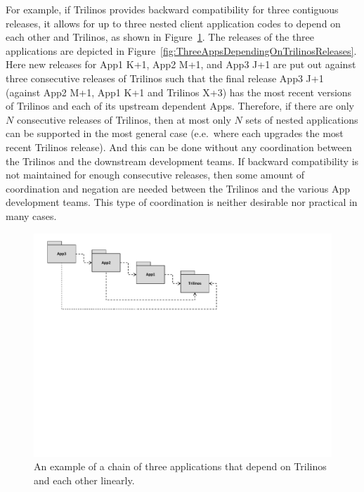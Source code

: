 \documentclass[11pt]{SANDreport}
\begin{document}
For example, if Trilinos provides backward compatibility for three
contiguous releases, it allows for up to three nested client
application codes to depend on each other and Trilinos, as shown in
Figure~\ref{fig:ThreeAppsDependingOnTrilinos}.  The releases of the
three applications are depicted in
Figure~\ref{fig:ThreeAppsDependingOnTrilinosReleases}.  Here new
releases for App1 K+1, App2 M+1, and App3 J+1 are put out against
three consecutive releases of Trilinos such that the final release
App3 J+1 (against App2 M+1, App1 K+1 and Trilinos X+3) has the most
recent versions of Trilinos and each of its upstream dependent Apps.
Therefore, if there are only $N$ consecutive releases of Trilinos,
then at most only $N$ sets of nested applications can be supported in
the most general case (e.e.\ where each upgrades the most recent
Trilinos release).  And this can be done without any coordination
between the Trilinos and the downstream development teams.  If
backward compatibility is not maintained for enough consecutive
releases, then some amount of coordination and negation are needed
between the Trilinos and the various App development teams.  This type
of coordination is neither desirable nor practical in many cases.

\begin{figure}[p]
\begin{center}
\includegraphics[trim = 0.2in 4.8in 3.6in 0.1in, scale=0.75]
{ThreeAppsDependingOnTrilinos}
{}\caption{An example of a chain of three applications that depend on
Trilinos and each other linearly.}
\label{fig:ThreeAppsDependingOnTrilinos}
\end{center}
\end{figure}
\end{document}
